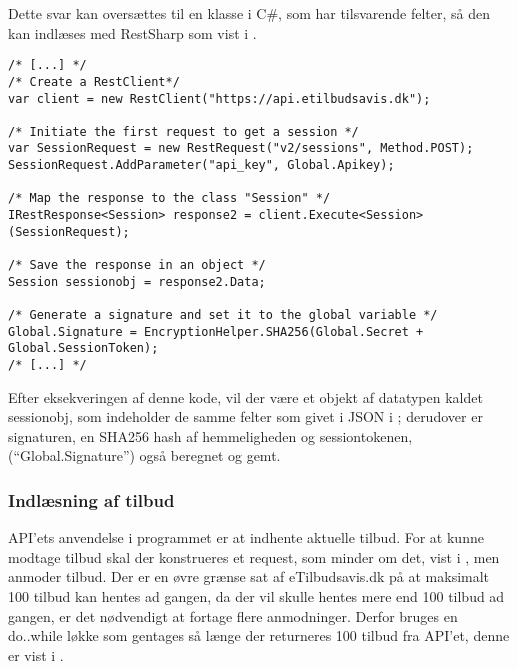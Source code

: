 Dette svar kan oversættes til en klasse i C\#, som har tilsvarende felter, så den kan indlæses med RestSharp som vist i .

\begin{lstlisting}[caption=C\#-kode som opretter en RestClient og anvender den til at oprette et objekt med felter som svarer til JSON dataet givet fra API'en, label=lst:session]
/* [...] */
/* Create a RestClient*/
var client = new RestClient("https://api.etilbudsavis.dk");

/* Initiate the first request to get a session */
var SessionRequest = new RestRequest("v2/sessions", Method.POST);
SessionRequest.AddParameter("api_key", Global.Apikey);

/* Map the response to the class "Session" */
IRestResponse<Session> response2 = client.Execute<Session>(SessionRequest);

/* Save the response in an object */
Session sessionobj = response2.Data;

/* Generate a signature and set it to the global variable */
Global.Signature = EncryptionHelper.SHA256(Global.Secret + Global.SessionToken);
/* [...] */
\end{lstlisting}
Efter eksekveringen af denne kode, vil der være et objekt af datatypen  kaldet sessionobj, som indeholder de samme felter som givet i JSON i ; derudover er signaturen, en SHA256 hash af hemmeligheden og sessiontokenen, (``Global.Signature'') også beregnet og gemt.

\subsubsection{Indlæsning af tilbud}
API'ets anvendelse i programmet er at indhente aktuelle tilbud.
For at kunne modtage tilbud skal der konstrueres et request, som minder om det, vist i , men anmoder tilbud.
Der er en øvre grænse sat af eTilbudsavis.dk på at maksimalt 100 tilbud kan hentes ad gangen, da der vil skulle hentes mere end 100 tilbud ad gangen, er det nødvendigt at fortage flere anmodninger.
Derfor bruges en do..while løkke som gentages så længe der returneres 100 tilbud fra API'et, denne er vist i .

